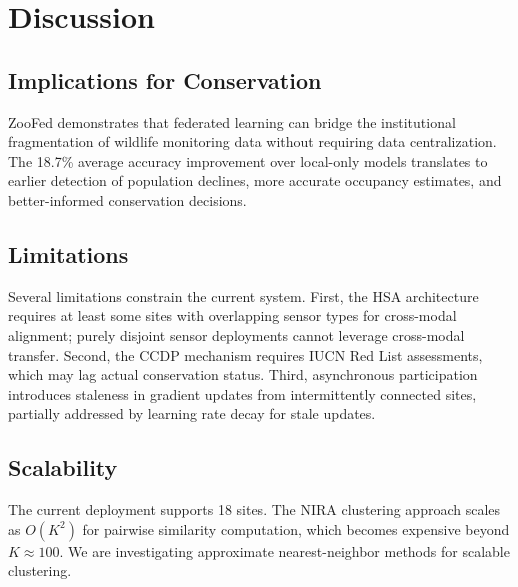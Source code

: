 \section{Discussion}

\label{sec:discussion}

\subsection{Implications for Conservation}

ZooFed demonstrates that federated learning can bridge the institutional fragmentation of wildlife monitoring data without requiring data centralization.
The 18.7\% average accuracy improvement over local-only models translates to earlier detection of population declines, more accurate occupancy estimates, and better-informed conservation decisions.

\subsection{Limitations}

Several limitations constrain the current system.
First, the HSA architecture requires at least some sites with overlapping sensor types for cross-modal alignment; purely disjoint sensor deployments cannot leverage cross-modal transfer.
Second, the CCDP mechanism requires IUCN Red List assessments, which may lag actual conservation status.
Third, asynchronous participation introduces staleness in gradient updates from intermittently connected sites, partially addressed by learning rate decay for stale updates.

\subsection{Scalability}

The current deployment supports 18 sites.
The NIRA clustering approach scales as $O(K^2)$ for pairwise similarity computation, which becomes expensive beyond $K \approx 100$.
We are investigating approximate nearest-neighbor methods for scalable clustering.

